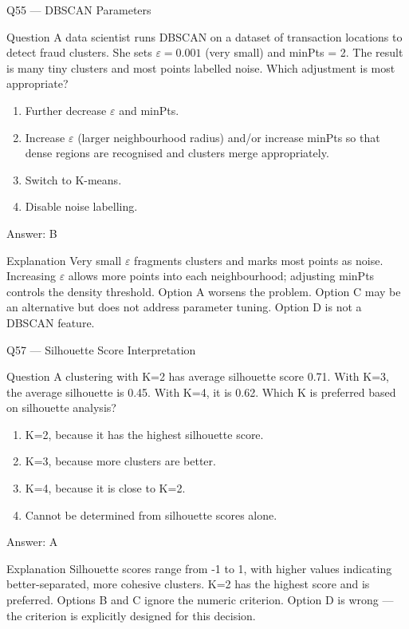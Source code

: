 \documentclass[aspectratio=169,8pt]{beamer}
\begin{document}
	\begin{frame}{Q55 --- DBSCAN Parameters}
		\begin{block}{Question}
			A data scientist runs DBSCAN on a dataset of transaction locations to detect fraud clusters. She sets $\varepsilon = 0.001$ (very small) and minPts = 2. The result is many tiny clusters and most points labelled noise. Which adjustment is most appropriate?
		\end{block}
		\begin{enumerate}
			\item Further decrease $\varepsilon$ and minPts.
			\item Increase $\varepsilon$ (larger neighbourhood radius) and/or increase minPts so that dense regions are recognised and clusters merge appropriately.
			\item Switch to K-means.
			\item Disable noise labelling.
		\end{enumerate}
		\begin{exampleblock}{Answer: B}\end{exampleblock}
		\begin{block}{Explanation}
			Very small $\varepsilon$ fragments clusters and marks most points as noise. Increasing $\varepsilon$ allows more points into each neighbourhood; adjusting minPts controls the density threshold. Option A worsens the problem. Option C may be an alternative but does not address parameter tuning. Option D is not a DBSCAN feature.
		\end{block}
	\end{frame}
	
	
	\begin{frame}{Q57 --- Silhouette Score Interpretation}
		\begin{block}{Question}
			A clustering with K=2 has average silhouette score 0.71. With K=3, the average silhouette is 0.45. With K=4, it is 0.62. Which K is preferred based on silhouette analysis?
		\end{block}
		\begin{enumerate}
			\item K=2, because it has the highest silhouette score.
			\item K=3, because more clusters are better.
			\item K=4, because it is close to K=2.
			\item Cannot be determined from silhouette scores alone.
		\end{enumerate}
		\begin{exampleblock}{Answer: A}\end{exampleblock}
		\begin{block}{Explanation}
			Silhouette scores range from -1 to 1, with higher values indicating better-separated, more cohesive clusters. K=2 has the highest score and is preferred. Options B and C ignore the numeric criterion. Option D is wrong --- the criterion is explicitly designed for this decision.
		\end{block}
	\end{frame}
	
\end{document}
